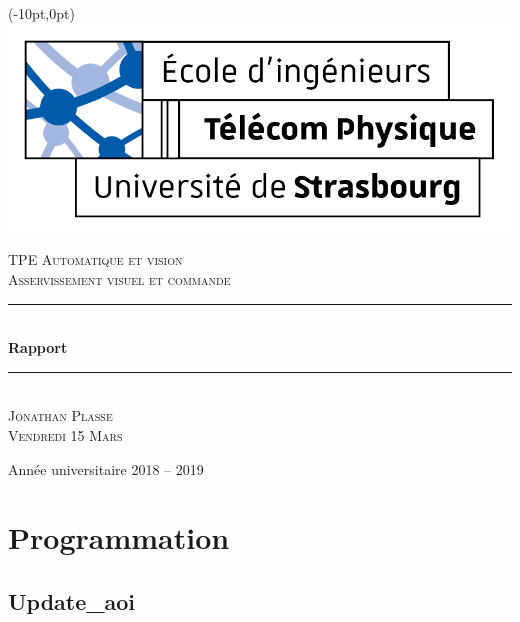 \documentclass[11pt,a4paper]{report}
\newcommand{\HRule}{\rule{\linewidth}{0.5mm}} %
\begin{document}
\begin{titlepage}

	\begin{textblock*}{6cm}(-10pt,0pt)
	\includegraphics[scale=0.7]{logo_tps.png}
	\end{textblock*}


  \begin{sffamily}
    \begin{center}

      \vfill
      \textsc{\LARGE TPE Automatique et vision}\\[0.5cm]

      \textsc{\Large Asservissement visuel et commande}\\[1cm]

      \HRule\\[0.4cm]
      {\huge \bfseries Rapport\\[0.4cm]}
      \HRule\\[1cm]

      \textsc{\Large Jonathan Plasse}\\[1cm]

      \textsc{\large Vendredi 15 Mars}



      \vfill

      {\large Année universitaire 2018 -- 2019}

    \end{center}
  \end{sffamily}
\end{titlepage}

\section*{Programmation}

	\subsection*{Update\_aoi}
\end{document}

